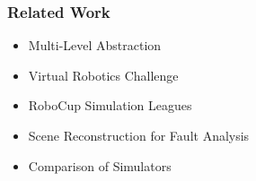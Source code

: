 \documentclass[]{beamer}
\begin{document}
\begin{frame}
  \frametitle{Related Work}
  \begin{multicols}{2}
    
    \begin{overlayarea}{0.52\textwidth}{.5\textheight}
      \begin{itemize}
      \item Multi-Level Abstraction
        \pause
      \item Virtual Robotics Challenge
        \pause
      \item RoboCup Simulation Leagues
        \pause
      \item Scene Reconstruction for Fault Analysis
        \pause
      \item Comparison of Simulators
      \end{itemize}
    \end{overlayarea}
  \end{multicols}
\end{frame}
\end{document}
